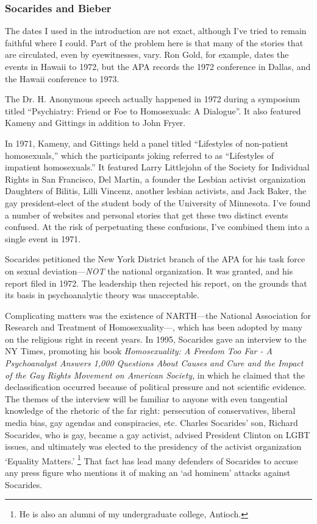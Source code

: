 \begin{refsection}
\subsubsection{Socarides and Bieber}
\label{socaridesandbieber}

The dates I used in the introduction are not exact, although I've tried to remain faithful where I could. Part of the problem here is that many of the stories that are circulated, even by eyewitnesses, vary. Ron Gold, for example, dates the events in Hawaii to 1972, but the APA records the 1972 conference in Dallas, and the Hawaii conference to 1973. 

The Dr. H. Anonymous speech actually happened in 1972 during a symposium titled “Psychiatry: Friend or Foe to Homosexuals: A Dialogue”. It also featured Kameny and Gittings in addition to John Fryer.

In 1971, Kameny, and Gittings held a panel titled “Lifestyles of non-patient homosexuals,” which the participants joking referred to as “Lifestyles of impatient homosexuals.” It featured Larry Littlejohn of the Society for Individual Rights in San Francisco, Del Martin, a founder the Lesbian activist organization Daughters of Bilitis, Lilli Vincenz, another lesbian activists, and Jack Baker, the gay president-elect of the student body of the University of Minnesota. I've found a number of websites and personal stories that get these two distinct events confused. At the risk of perpetuating these confusions, I've combined them into a single event in 1971.

Socarides petitioned the New York District branch of the APA for his task force on sexual deviation---\emph{NOT} the national organization. It was granted, and his report filed in 1972. The leadership then rejected his report, on the grounds that its basis in psychoanalytic theory was unacceptable. 

Complicating matters was the existence of NARTH---the National Association for Research and Treatment of Homosexuality---, which has been adopted by many on the religious right in recent years. In 1995, Socarides gave an interview to the NY Times, promoting his book \emph{Homosexuality: A Freedom Too Far - A Psychoanalyst Answers 1,000 Questions About Causes and Cure and the Impact of the Gay Rights Movement on American Society}, in which he claimed that the declassification occurred because of political pressure and not scientific evidence. The themes of the interview will be familiar to anyone with even tangential knowledge of the rhetoric of the far right: persecution of conservatives, liberal media bias, gay agendas and conspiracies, etc. Charles Socarides' son, Richard Socarides, who is gay, became a gay activist, advised President Clinton on LGBT issues, and ultimately was elected to the presidency of the activist organization `Equality Matters.' \footnote{He is also an alumni of my undergraduate college, Antioch.} That fact has lead many defenders of Socarides to accuse any press figure who mentions it of making an `ad hominem' attacks against Socarides. 


\end{refsection}
